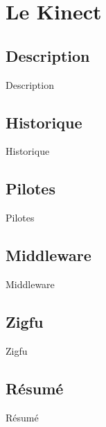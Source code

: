 \section{Le Kinect}

\begin{frame}
\end{frame}

\subsection{Description}
\begin{frame}{Description}
\end{frame}

\subsection{Historique}
\begin{frame}{Historique}
\end{frame}

\subsection{Pilotes}
\begin{frame}{Pilotes}
\end{frame}

\subsection{Middleware}
\begin{frame}{Middleware}
\end{frame}

\subsection{Zigfu}
\begin{frame}{Zigfu}
\end{frame}

\subsection{Résumé}
\begin{frame}{Résumé}
\end{frame}